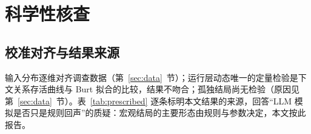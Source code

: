 \documentclass[10.5pt,twocolumn]{ctexart}
\begin{document}
\begin{table}[t]
\centering\small
\caption{干预组合（规则层 20 种子、校准画像、$b=0$；LLM 层为新路由 gpt-6-astra seed~1 单 run）。孤立率为窗口均值（\%），孤独感为撤出后均值；规则层撤出期为第 19--30 月，LLM 层为第 19--24 月。}
\label{tab:combo}
\end{table}

\section{科学性核查}\label{sec:honest}
\subsection{校准对齐与结果来源}
输入分布逐维对齐调查数据（第~\ref{sec:data}~节）；运行层动态唯一的定量检验是下文关系存活曲线与 Burt 拟合的比较，结果不吻合；孤独结局尚无检验（原因见第~\ref{sec:data}~节）。表~\ref{tab:prescribed} 逐条标明本文结果的来源，回答``LLM 模拟是否只是规则回声''的质疑：宏观结局的主要形态由规则与参数决定，本文按此报告。
\end{document}
